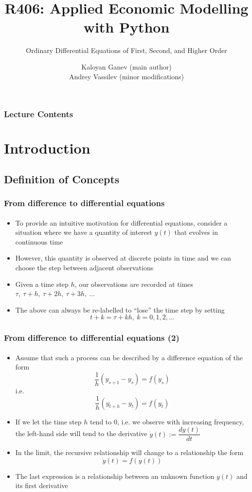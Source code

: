\documentclass[10pt,usenames,dvipsnames]{beamer}
\title{R406: Applied Economic Modelling with Python}
\subtitle{\textcolor{myred}{Ordinary Differential Equations of First, Second, and Higher Order}}
\author[Kaloyan Ganev,  Andrey Vassilev]{Kaloyan Ganev (main author) \\
	Andrey Vassilev (minor modifications)}
\date{}
\theoremstyle{definition}
\begin{document}
\maketitle

\begin{frame}[fragile]
\frametitle{Lecture Contents}
\tableofcontents
\end{frame}

\section{Introduction}
\subsection{Definition of Concepts}
\begin{frame}[fragile]
	\frametitle{From difference to differential equations} %
	\framesubtitle{}
		\begin{itemize}
		\item To provide an intuitive motivation for differential equations, consider a situation where we have a quantity of interest $ y(t) $ that evolves in  continuous time
		\item However, this quantity is observed at discrete points in time and we can choose the step between adjacent observations
		\item Given a time step $ h $, our observations are recorded at times $\tau,~ \tau+h,~ \tau+2h,~\tau+3h,~ \ldots$
		\item The above can always be re-labelled to ``lose'' the time step by setting \[ t+k = \tau + kh, ~ k=0,1,2,\ldots \]
		
	\end{itemize}
\end{frame}

\begin{frame}[fragile]
	\frametitle{From difference to differential equations (2)}
	\framesubtitle{}
	\begin{itemize}
		\item Assume that such a process can be described by a difference equation of the form
		\[ \dfrac{1}{h}(y_{s+1}-y_s) = f(y_s) \] i.e.
		\[ \dfrac{1}{h}(y_{t+h}-y_t) = f(y_t) \]
		\item If we let the time step $ h $ tend to 0, i.e. we observe with increasing frequency, the left-hand side will tend to the derivative $ \dot{y}(t) := \dfrac{dy(t)}{dt} $
		\item In the limit, the recursive relationship will change to a relationship the form \[ \dot{y}(t) = f(y(t)) \]
		\item The last expression is a relationship between an unknown function $ y(t) $ and its first derivative
	\end{itemize}
\end{frame}
\end{document}
